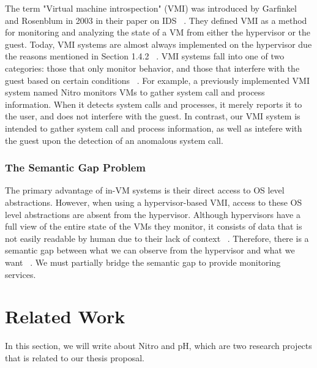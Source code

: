 \documentclass{report}
\begin{document}
\begin{spacing}{1.5}
{\large
The term "Virtual machine introspection" (VMI) was introduced by Garfinkel and Rosenblum in 2003 in their paper on IDS ~\cite{garfinkel2003virtual}. They defined VMI as a method for monitoring and analyzing the state of a VM from either the hypervisor or the guest. Today, VMI systems are almost always implemented on the hypervisor due the reasons mentioned in Section 1.4.2 ~\cite{bhatt2018using}. VMI systems fall into one of two categories: those that only monitor behavior, and those that interfere with the guest based on certain conditions ~\cite{nance2008virtual}. For example, a previously implemented VMI system named Nitro monitors VMs to gather system call and process information. When it detects system calls and processes, it merely reports it to the user, and does not interfere with the guest. In contrast, our VMI system is intended to gather system call and process information, as well as intefere with the guest upon the detection of an anomalous system call.
\newline
}


\subsection{The Semantic Gap Problem}

{\large
The primary advantage of in-VM systems is their direct access to OS level abstractions. However, when using a hypervisor-based VMI, access to these OS level abstractions are absent from the hypervisor. Although hypervisors have a full view of the entire state of the VMs they monitor, it consists of data that is not easily readable by human due to their lack of context ~\cite{bauman2015survey}. Therefore, there is a semantic gap between what we can observe from the hypervisor and what we want ~\cite{bauman2015survey}. We must partially bridge the semantic gap to provide monitoring services.
\newline
}


















\chapter{Related Work}

{\large
In this section, we will write about Nitro and pH, which are two research projects that is related to our thesis proposal. 
\newline
}


\end{spacing}
\end{document}
